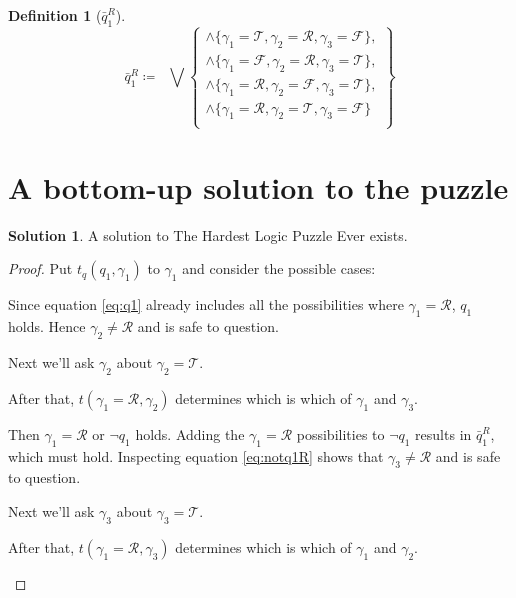 \documentclass[twoside,twocolumn,a4paper,11pt]{article}
\theoremstyle{definition}
\newtheorem{defn}[theorem]{Definition}
\newtheorem{solution}[theorem]{Solution}
\begin{document}
\begin{defn}[$\bar{q}_1^R$]
\label{def:notq1R}
\begin{equation}
\label{eq:notq1R}
\bar{q}_1^R \coloneqq\;\;
\bigvee
 \left\lbrace
  \begin{matrix}
   \land\{\gamma_1=\mathcal{T},\gamma_2=\mathcal{R},\gamma_3=\mathcal{F}\},\\
   \land\{\gamma_1=\mathcal{F},\gamma_2=\mathcal{R},\gamma_3=\mathcal{T}\},\\
   \land\{\gamma_1=\mathcal{R},\gamma_2=\mathcal{F},\gamma_3=\mathcal{T}\},\\
   \land\{\gamma_1=\mathcal{R},\gamma_2=\mathcal{T},\gamma_3=\mathcal{F}\}\;\\
  \end{matrix}
 \right\rbrace 
\end{equation}
\end{defn}


\section{A bottom-up solution to the puzzle}
\begin{solution}
\label{solution:bottomUp}
A solution to The Hardest Logic Puzzle Ever exists.
\end{solution}
\begin{proof}
Put $t_q(q_1,\gamma_1)$ to $\gamma_1$ and consider the possible cases:
\begin{description}[itemsep=2pt,topsep=3pt,leftmargin=1.1em]
\item[Case \(t(q_1,\gamma_1)\):] \hspace{0.2em}Since equation \eqref{eq:q1}
 already includes all the possibilities where $\gamma_1=\mathcal{R}$,
 $q_1$ holds.
 Hence $\gamma_2\neq\mathcal{R}$ and is safe to question.

 Next we'll ask $\gamma_2$ about $\gamma_2=\mathcal{T}$.
 
 After that, $t(\gamma_1=\mathcal{R},\gamma_2)$ determines which is which of $\gamma_1$ and
 $\gamma_3$.

\item[Case \(\neg t(q_1,\gamma_1)\):] \hspace{0.2em}Then $\gamma_1=\mathcal{R}$ or
 $\neg q_1$ holds. Adding the $\gamma_1=\mathcal{R}$ possibilities to $\neg q_1$ results in
 $\bar{q}_1^R$, which must hold. Inspecting equation \eqref{eq:notq1R} shows that
 $\gamma_3\neq\mathcal{R}$ and is safe to question.

 Next we'll ask $\gamma_3$ about $\gamma_3=\mathcal{T}$.
 
 After that, $t(\gamma_1=\mathcal{R},\gamma_3)$ determines which is which of $\gamma_1$ and
 $\gamma_2$.
\end{description}
\vspace{-1.5em}
\end{proof}
\end{document}
